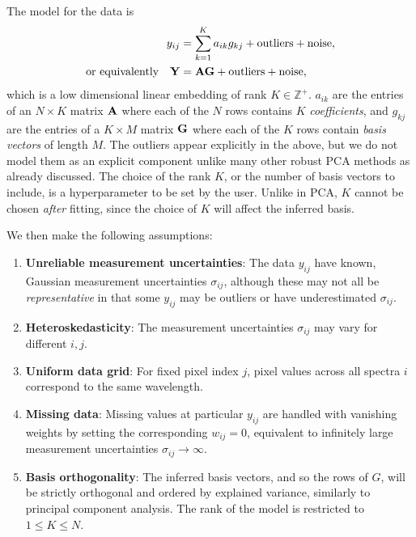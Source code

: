 \documentclass[onecolumn,floatfix]{aastex631}
\begin{document}
The model for the data is
\begin{align}
    y_{ij} &= \sum_{k=1}^K a_{ik} g_{kj} + \rm{outliers} + \rm{noise}, \\
    \rm{or \,\, equivalently} \quad {\bf Y} &= {\bf A} {\bf G} + \rm{outliers} + \rm{noise}, \label{eq:model}
\end{align}
which is a low dimensional linear embedding of rank $K\in\mathbb{Z}^+$.
$a_{ik}$ are the entries of an $N \times K$ matrix ${\bf A}$ where each of the $N$ rows contains $K$ \emph{coefficients}, and $g_{kj}$ are the entries of a $K \times M$ matrix ${\bf G}$ where each of the $K$ rows contain \emph{basis vectors} of length $M$.
The outliers appear explicitly in the above, but we do not model them as an explicit component unlike many other robust PCA methods as already discussed.
The choice of the rank $K$, or the number of basis vectors to include, is a hyperparameter to be set by the user.
Unlike in PCA, $K$ cannot be chosen \emph{after} fitting, since the choice of $K$ will affect the inferred basis.

We then make the following assumptions:
\begin{enumerate}
    \item \textbf{Unreliable measurement uncertainties}: The data $y_{ij}$ have known, Gaussian measurement uncertainties $\sigma_{ij}$, although these may not all be \emph{representative} in that some $y_{ij}$ may be outliers or have underestimated $\sigma_{ij}$.
    \item \textbf{Heteroskedasticity}: The measurement uncertainties $\sigma_{ij}$ may vary for different $i,j$.
    \item \textbf{Uniform data grid}: For fixed pixel index $j$, pixel values across all spectra $i$ correspond to the same wavelength.
    \item \textbf{Missing data}: Missing values at particular $y_{ij}$ are handled with vanishing weights by setting the corresponding $w_{ij}=0$, equivalent to infinitely large measurement uncertainties $\sigma_{ij}\rightarrow\infty$.
    \item \textbf{Basis orthogonality}: The inferred basis vectors, and so the rows of $G$, will be strictly orthogonal and ordered by explained variance, similarly to principal component analysis. The rank of the model is restricted to $1 \le K \le N$.
\end{enumerate}
\end{document}
